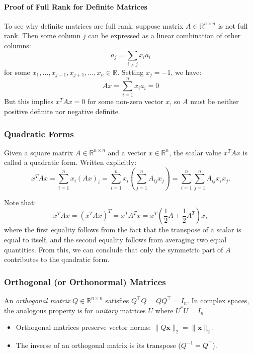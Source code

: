 \paragraph{Proof of Full Rank for Definite Matrices}
To see why definite matrices are full rank, suppose matrix $A \in \mathbb{R}^{n\times n}$ is not full rank. Then some column $j$ can be expressed as a linear combination of other columns:
\[
a_j = \sum_{i\neq j} x_ia_i
\]
for some $x_1, \ldots, x_{j-1}, x_{j+1}, \ldots, x_n \in \mathbb{R}$. Setting $x_j = -1$, we have:
\[
Ax = \sum_{i=1}^n x_ia_i = 0
\]
But this implies $x^T Ax = 0$ for some non-zero vector $x$, so $A$ must be neither positive definite nor negative definite.

\subsubsection{Quadratic Forms}
Given a square matrix $A \in \mathbb{R}^{n\times n}$ and a vector $x \in \mathbb{R}^n$, the scalar value $x^T Ax$ is called a quadratic form. Written explicitly:
\[
x^T Ax = \sum_{i=1}^n x_i(Ax)_i = \sum_{i=1}^n x_i\left(\sum_{j=1}^n A_{ij} x_j\right) = \sum_{i=1}^n\sum_{j=1}^n A_{ij} x_ix_j.
\]

Note that:
\[
x^T Ax = (x^T Ax)^T = x^T A^T x = x^T\left(\frac{1}{2}A + \frac{1}{2}A^T\right)x,
\]
where the first equality follows from the fact that the transpose of a scalar is equal to itself, and the second equality follows from averaging two equal quantities. From this, we can conclude that only the symmetric part of $A$ contributes to the quadratic form.

\subsubsection{Orthogonal (or Orthonormal) Matrices}
An \emph{orthogonal matrix} $Q \in \mathbb{R}^{n \times n}$ satisfies $Q^\top Q = QQ^\top = I_n$. 
In complex spaces, the analogous property is for \emph{unitary} matrices $U$ where $U^* U = I_n$. 
\begin{itemize}
    \item Orthogonal matrices preserve vector norms: $\|Q \mathbf{x}\|_2 = \|\mathbf{x}\|_2$.
    \item The inverse of an orthogonal matrix is its transpose ($Q^{-1} = Q^\top$).
\end{itemize}


